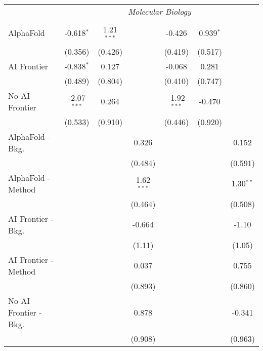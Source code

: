 \begin{tabular}{lcccccc}
 & \multicolumn{6}{c}{\textit{Molecular Biology}} \\ \\
   AlphaFold               & -0.618$^{*}$  & 1.21$^{***}$ &              & -0.426        & 0.939$^{*}$ &   \\   
                           & (0.356)       & (0.426)      &              & (0.419)       & (0.517)     &   \\   
   AI Frontier             & -0.838$^{*}$  & 0.127        &              & -0.068        & 0.281       &   \\   
                           & (0.489)       & (0.804)      &              & (0.410)       & (0.747)     &   \\   
   No AI Frontier          & -2.07$^{***}$ & 0.264        &              & -1.92$^{***}$ & -0.470      &   \\   
                           & (0.533)       & (0.910)      &              & (0.446)       & (0.920)     &   \\   
   AlphaFold - Bkg.        &               &              & 0.326        &               &             & 0.152\\   
                           &               &              & (0.484)      &               &             & (0.591)\\   
   AlphaFold - Method      &               &              & 1.62$^{***}$ &               &             & 1.30$^{**}$\\   
                           &               &              & (0.464)      &               &             & (0.508)\\   
   AI Frontier - Bkg.      &               &              & -0.664       &               &             & -1.10\\   
                           &               &              & (1.11)       &               &             & (1.05)\\   
   AI Frontier - Method    &               &              & 0.037        &               &             & 0.755\\   
                           &               &              & (0.893)      &               &             & (0.860)\\   
   No AI Frontier - Bkg.   &               &              & 0.878        &               &             & -0.341\\   
                           &               &              & (0.908)      &               &             & (0.963)\\   

\end{tabular}
